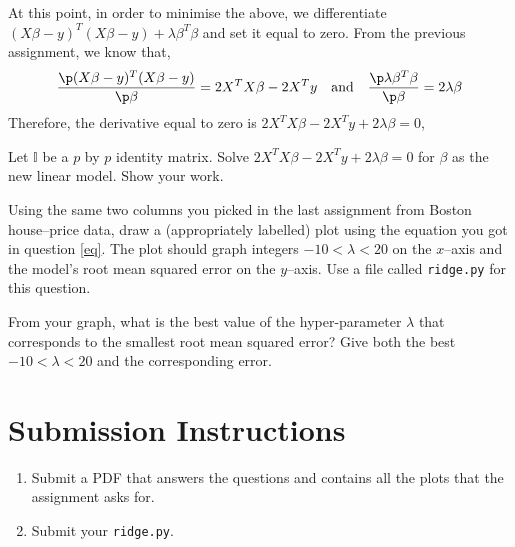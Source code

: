 \documentclass{homework}
\begin{document}
At this point, in order to minimise the above, we differentiate
$(X\beta - y)^T(X\beta - y)+\lambda\beta^T\beta$ and set it equal to
zero. From the previous assignment, we know that,
\[
  \frac{\p (X\beta - y)^T(X\beta - y)}{\p \beta} = 2X^TX\beta - 2X^Ty
  \quad\text{and}\quad
  \frac{\p \lambda\beta^T\beta}{\p\beta} = 2\lambda \beta
\]
Therefore, the derivative equal to zero is
$2X^TX\beta - 2X^Ty + 2\lambda \beta = 0$,

\question\label{eq} Let $\mathbb{I}$ be a $p$ by $p$ identity
matrix. Solve $2X^TX\beta - 2X^Ty + 2\lambda \beta = 0$ for $\beta$ as
the new linear model. Show your work.


\question Using the same two columns you picked in the last assignment
from Boston house--price data, draw a (appropriately labelled) plot
using the equation you got in question \ref{eq}. The plot should graph
integers $-10 < \lambda <20$ on the $x$--axis and the model's root
mean squared error on the $y$--axis. Use a file called
\texttt{ridge.py} for this question.


\question From your graph, what is the best value of the
hyper-parameter $\lambda$ that corresponds to the smallest root mean
squared error? Give both the best $-10 < \lambda <20$ and the
corresponding error.


\section*{Submission Instructions}

\begin{enumerate}
  \item Submit a PDF that answers the questions and contains all the
        plots that the assignment asks for.
  \item Submit your \texttt{ridge.py}.
\end{enumerate}
\end{document}
